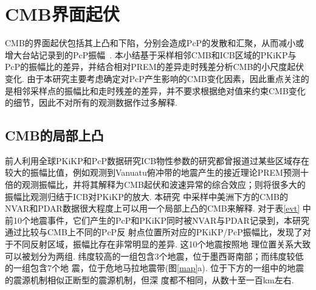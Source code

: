 \section{CMB界面起伏}

CMB的界面起伏包括其上凸和下陷，分别会造成PcP的发散和汇聚，从而减小或增大台站记录到的PcP振幅~\citep{Neuberg1991}. 本小结基于采样相邻CMB和ICB区域的PKiKP与PcP的振幅比的差异，并结合相对PREM的差异走时残差分析CMB的小尺度起伏变化. 由于本研究主要考虑确定对PcP产生影响的CMB变化因素，因此重点关注的是相邻采样点的振幅比和走时残差的差异，并不要求根据绝对值来约束CMB变化的细节，因此不对所有的观测数据作过多解释. 

\subsection{CMB的局部上凸}

 前人利用全球PKiKP和PcP数据研究ICB物性参数的研究都曾报道过某些区域存在较大的振幅比值，例如\citet{Koper2004a}观测到Vanuatu俯冲带的地震产生的接近理论PREM预测十倍的观测振幅比，并将其解释为CMB起伏和波速异常的综合效应；\citet{Waszek2015a}则将很多大的振幅比观测归结于ICB对PKiKP的放大. 本研究
中采样中美洲下方的CMB的NVAR和PDAR数据很大程度上可以用一个局部上凸的CMB来解释. 对于表\ref{evt}
中前10个地震事件，它们产生的PcP和PKiKP同时被NVAR与PDAR记录到，本研究通过比较与CMB上不同的PcP反
射点位置所对应的PKiKP/PcP振幅比，发现了对于不同反射区域，振幅比存在非常明显的差异. 这10个地震按照地
理位置关系大致可以被划分为两组. 纬度较高的一组包含3个地震，位于墨西哥南部；而纬度较低的一组包含7个地
震，位于危地马拉地震带(图\ref{map}a). 位于下方的一组中的地震的震源机制相似正断型的震源机制，但深
度都不相同，从数十至一百km左右. 

